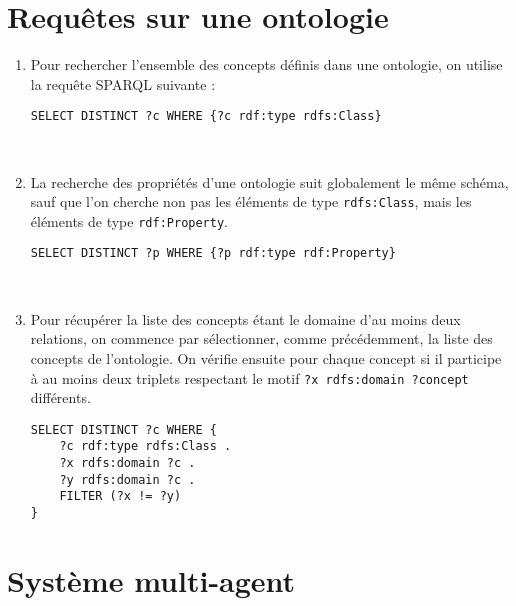 \documentclass[a4paper,11pt]{article}
\begin{document}


\newpage
\section{Requêtes sur une ontologie}
\begin{enumerate}
\item Pour rechercher l'ensemble des concepts définis dans une ontologie, on utilise la requête SPARQL suivante :
\begin{lstlisting}[language=SPARQL]
SELECT DISTINCT ?c WHERE {?c rdf:type rdfs:Class}
\end{lstlisting}
~\\\vspace*{-.5cm}
\item La recherche des propriétés d'une ontologie suit globalement le même schéma, sauf que l'on cherche non pas les éléments de type \lstinline$rdfs:Class$, mais les éléments de type \lstinline$rdf:Property$.
\begin{lstlisting}[language=SPARQL]
SELECT DISTINCT ?p WHERE {?p rdf:type rdf:Property}
\end{lstlisting}
~\\\vspace*{-.5cm}
\item Pour récupérer la liste des concepts étant le domaine d'au moins deux relations, on commence par sélectionner, comme précédemment, la liste des concepts de l'ontologie.
On vérifie ensuite pour chaque concept si il participe à au moins deux triplets respectant le motif \lstinline$?x rdfs:domain ?concept$ différents.
\begin{lstlisting}[language=SPARQL]
SELECT DISTINCT ?c WHERE {
	?c rdf:type rdfs:Class .
	?x rdfs:domain ?c .
	?y rdfs:domain ?c .
	FILTER (?x != ?y)
}
\end{lstlisting}
\end{enumerate}

\section{Système multi-agent}
\end{document}
